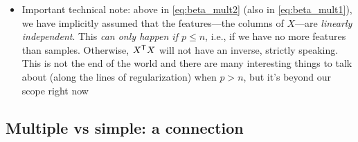 \documentclass{article}
\begin{document}
\begin{itemize}
\item Important technical note: above in \eqref{eq:beta_mult2} (also in
  \eqref{eq:beta_mult1}), we have implicitly assumed that the features---the 
  columns of $X$---are \emph{linearly independent}. This \emph{can only happen
    if $p \leq n$}, i.e., if we have no more features than samples. Otherwise,
  $X^{\mathsf{T}} X$ will not have an inverse, strictly speaking. This is not the end of
  the world and there are many interesting things to talk about (along the lines
  of regularization) when $p > n$, but it's beyond our scope right now
\end{itemize}

\subsection{Multiple vs simple: a connection}
\end{document}
